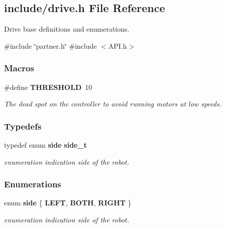 \subsection{include/drive.h File Reference}
\label{a00014}


Drive base definitions and enumerations.  


{\ttfamily \#include \char`\"{}partner.\+h\char`\"{}}\newline
{\ttfamily \#include $<$A\+P\+I.\+h$>$}\newline
\subsubsection*{Macros}
\begin{DoxyCompactItemize}
\item 
\#define \textbf{ T\+H\+R\+E\+S\+H\+O\+LD}~10
\begin{DoxyCompactList}\small\item\em The dead spot on the controller to avoid running motors at low speeds. \end{DoxyCompactList}\end{DoxyCompactItemize}
\subsubsection*{Typedefs}
\begin{DoxyCompactItemize}
\item 
typedef enum \textbf{ side} \textbf{ side\+\_\+t}
\begin{DoxyCompactList}\small\item\em enumeration indication side of the robot. \end{DoxyCompactList}\end{DoxyCompactItemize}
\subsubsection*{Enumerations}
\begin{DoxyCompactItemize}
\item 
enum \textbf{ side} \{ \textbf{ L\+E\+FT}, 
\textbf{ B\+O\+TH}, 
\textbf{ R\+I\+G\+HT}
 \}\begin{DoxyCompactList}\small\item\em enumeration indication side of the robot. \end{DoxyCompactList}
\end{DoxyCompactItemize}
